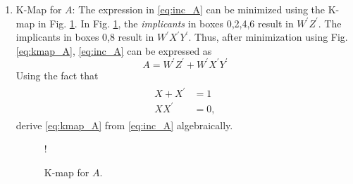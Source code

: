 \renewcommand{\theequation}{\theenumi}
\renewcommand{\thefigure}{\theenumi}
\begin{enumerate}[label=\thesubsection.\arabic*.,ref=\thesubsection.\theenumi]

\item K-Map for $A$: 
The expression in \eqref{eq:inc_A}  can be minimized using the K-map in Fig. \ref{fig:kmap_A}.
In Fig. \ref{fig:kmap_A},  the {\em implicants} in boxes 0,2,4,6 result in $W^{\prime}Z^{\prime}$.  The implicants in
boxes 0,8 result in $W^{\prime}X^{\prime}Y^{\prime}$.  Thus, after minimization using Fig. \ref{eq:kmap_A},  \eqref{eq:inc_A} can be expressed as
%
\begin{equation}
\label{eq:kmap_A}
A = W^{\prime}Z^{\prime}+W^{\prime}X^{\prime}Y^{\prime}
\end{equation}
%
Using the fact that
\begin{align}
\label{eq:inc_Boolean}
\begin{split}
X+X^{\prime} &= 1
\\
XX^{\prime} &= 0,
\end{split}
\end{align}
%
derive \eqref{eq:kmap_A} from \eqref{eq:inc_A} algebraically.
%
%
%
\begin{figure}[!h]
\resizebox {\columnwidth} {!} {

}
\caption{K-map for $A$.}
\label{fig:kmap_A}
\end{figure}


\end{enumerate}
